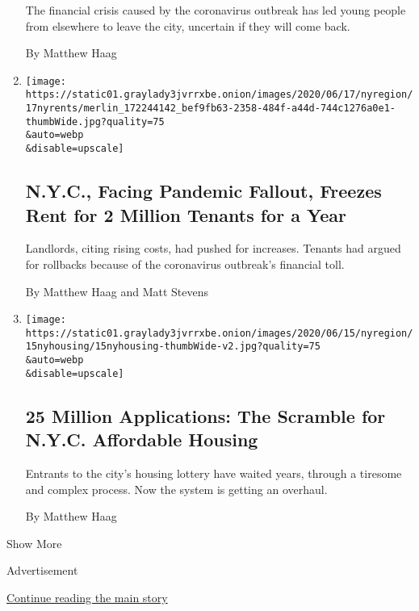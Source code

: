 \begin{enumerate}
  The financial crisis caused by the coronavirus outbreak has led young
  people from elsewhere to leave the city, uncertain if they will come
  back.

  By Matthew Haag
\item
  \href{/2020/06/17/nyregion/nyc-rent-guidelines-board-freeze.html}{}

  \texttt{[image: https://static01.graylady3jvrrxbe.onion/images/2020/06/17/nyregion/17nyrents/merlin\_172244142\_bef9fb63-2358-484f-a44d-744c1276a0e1-thumbWide.jpg?quality=75\\\&auto=webp\\\&disable=upscale]}

  \hypertarget{nyc-facing-pandemic-fallout-freezes-rent-for-2-million-tenants-for-a-year}{%
  \subsection{N.Y.C., Facing Pandemic Fallout, Freezes Rent for 2
  Million Tenants for a
  Year}\label{nyc-facing-pandemic-fallout-freezes-rent-for-2-million-tenants-for-a-year}}

  Landlords, citing rising costs, had pushed for increases. Tenants had
  argued for rollbacks because of the coronavirus outbreak's financial
  toll.

  By Matthew Haag and Matt Stevens
\item
  \href{/2020/06/15/nyregion/nyc-affordable-housing-lottery.html}{}

  \texttt{[image: https://static01.graylady3jvrrxbe.onion/images/2020/06/15/nyregion/15nyhousing/15nyhousing-thumbWide-v2.jpg?quality=75\\\&auto=webp\\\&disable=upscale]}

  \hypertarget{25-million-applications-the-scramble-for-nyc-affordable-housing}{%
  \subsection{25 Million Applications: The Scramble for N.Y.C.
  Affordable
  Housing}\label{25-million-applications-the-scramble-for-nyc-affordable-housing}}

  Entrants to the city's housing lottery have waited years, through a
  tiresome and complex process. Now the system is getting an overhaul.

  By Matthew Haag
\end{enumerate}

Show More

Advertisement

\protect\hyperlink{after-mid2}{Continue reading the main story}

